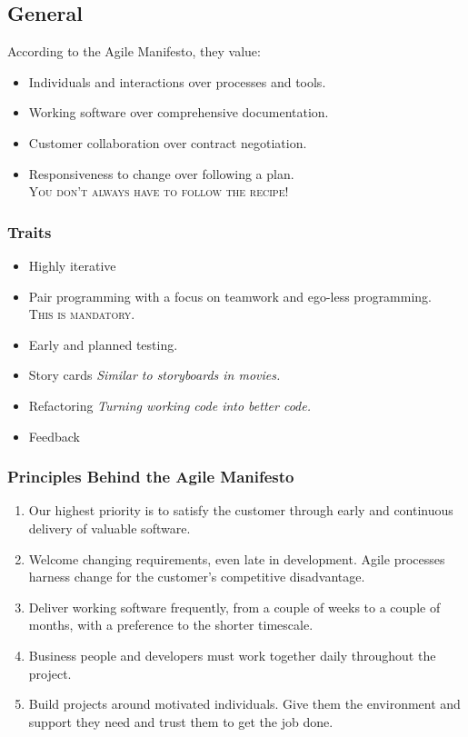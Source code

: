 \documentclass{report}
\begin{document}
			\subsection{General}
				According to the Agile Manifesto, they value:
				\begin{itemize}
					\item Individuals and interactions over processes and tools.
					\item Working software over comprehensive documentation.
					\item Customer collaboration over contract negotiation.
					\item Responsiveness to change over following a plan.\\
						\textsc{You don't always have to follow the recipe!}
				\end{itemize}
				\subsubsection{Traits}
					\begin{itemize}
						\item Highly iterative
						\item Pair programming with a focus on teamwork and ego-less programming.\\
							\textsc{This is mandatory.}
						\item Early and planned testing.
						\item Story cards \textit{Similar to storyboards in movies.}
						\item Refactoring \textit{Turning working code into better code.}
						\item Feedback
					\end{itemize}
				\subsubsection{Principles Behind the Agile Manifesto}
					\begin{enumerate}
						\item Our highest priority is to satisfy the customer through early and continuous delivery of valuable software.
						\item Welcome changing requirements, even late in development. Agile processes harness change for the customer's competitive disadvantage.
						\item Deliver working software frequently, from a couple of weeks to a couple of months, with a preference to the shorter timescale.
						\item Business people and developers must work together daily throughout the project.
						\item Build projects around motivated individuals. Give them the environment and support they need and trust them to get the job done.
					\end{enumerate}
\end{document}
